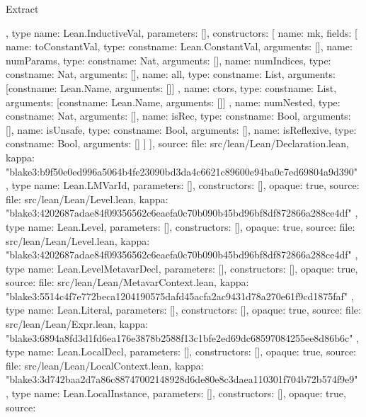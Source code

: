 \begin{lexlean}{Extract}
\begin{toolingmodule}
{{{      }
    },
    type{
      name: Lean.InductiveVal,
      parameters: [],
      constructors: [
        {
          name: mk,
          fields: [
            {name: toConstantVal, type: const{name: Lean.ConstantVal, arguments: []}},
            {name: numParams, type: const{name: Nat, arguments: []}},
            {name: numIndices, type: const{name: Nat, arguments: []}},
            {
              name: all,
              type: const{name: List, arguments: [const{name: Lean.Name, arguments: []}]}
            },
            {
              name: ctors,
              type: const{name: List, arguments: [const{name: Lean.Name, arguments: []}]}
            },
            {name: numNested, type: const{name: Nat, arguments: []}},
            {name: isRec, type: const{name: Bool, arguments: []}},
            {name: isUnsafe, type: const{name: Bool, arguments: []}},
            {name: isReflexive, type: const{name: Bool, arguments: []}}
          ]
        }
      ],
      source: {
        file: src/lean/Lean/Declaration.lean,
        kappa: "blake3:b9f50e0ed996a5064b4fe23090bd3da4c6621c89600e94ba0c7ed69804a9d390"
      }
    },
    type{
      name: Lean.LMVarId,
      parameters: [],
      constructors: [],
      opaque: true,
      source: {
        file: src/lean/Lean/Level.lean,
        kappa: "blake3:4202687adae84f09356562c6eaefa0c70b090b45bd96bf8df872866a288ce4df"
      }
    },
    type{
      name: Lean.Level,
      parameters: [],
      constructors: [],
      opaque: true,
      source: {
        file: src/lean/Lean/Level.lean,
        kappa: "blake3:4202687adae84f09356562c6eaefa0c70b090b45bd96bf8df872866a288ce4df"
      }
    },
    type{
      name: Lean.LevelMetavarDecl,
      parameters: [],
      constructors: [],
      opaque: true,
      source: {
        file: src/lean/Lean/MetavarContext.lean,
        kappa: "blake3:5514c4f7e772beca1204190575dafd45acfa2ac9431d78a270e61f9cd1875faf"
      }
    },
    type{
      name: Lean.Literal,
      parameters: [],
      constructors: [],
      opaque: true,
      source: {
        file: src/lean/Lean/Expr.lean,
        kappa: "blake3:6894a8fd3d1fd6ea176e3878b2588f13c1bfe2ed69dc68597084255ee8d86b6c"
      }
    },
    type{
      name: Lean.LocalDecl,
      parameters: [],
      constructors: [],
      opaque: true,
      source: {
        file: src/lean/Lean/LocalContext.lean,
        kappa: "blake3:3d742baa2d7a86c88747002148928d6de80e8c3daea110301f704b72b574f9e9"
      }
    },
    type{
      name: Lean.LocalInstance,
      parameters: [],
      constructors: [],
      opaque: true,
      source: {
}}}
\end{toolingmodule}
\end{lexlean}
